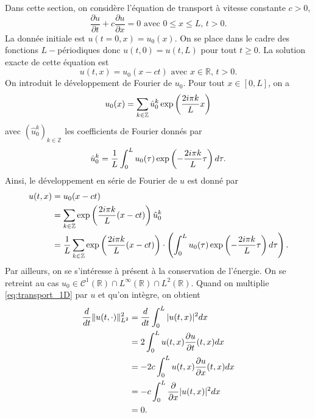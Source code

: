 Dans cette section, on considère l'équation de transport à vitesse constante $c>0$,
\begin{equation}
\dfrac{\partial u}{\partial t} + c \dfrac{\partial u}{\partial x} = 0 \text{ avec } 0 \leq x \leq L \text{, } t>0.
\label{eq:transport_1D}
\end{equation}
La donnée initiale est $u(t=0,x)=u_0(x)$. On se place dans le cadre des fonctions $L-$périodiques donc $u(t,0)=u(t,L)$ pour tout $t \geq 0$. La solution exacte de cette équation est
\begin{equation}
u(t,x) = u_0(x-ct)  \text{ avec } x \in \mathbb{R} \text{, } t>0.
\label{eq:trsp_exact}
\end{equation}
On introduit le développement de Fourier de $u_0$. Pour tout $x \in [0,L]$, on a
\begin{equation}
u_0(x) = \displaystyle\sum\limits_{k \in \mathbb{Z}} \hat{u}_0^k \exp \left( \dfrac{2i \pi k}{L} x \right)
\end{equation}
avec $(\hat{u}_0^k)_{k \in \mathbb{Z}}$ les coefficients de Fourier donnés par
\begin{equation}
\hat{u}_0^k = \dfrac{1}{L} \displaystyle\int_0^L u_0(\tau)  \exp \left( -\dfrac{2i \pi k}{L} \tau \right) d \tau.
\end{equation}
Ainsi, le développement en série de Fourier de $u$ est donné par
\begin{align}
u(t,x) & = u_0(x-ct)\\
	& = \displaystyle\sum\limits_{k \in \mathbb{Z}} \exp \left( \dfrac{2i \pi k}{L} (x-ct) \right) \hat{u}_0^k  \\
	& = \dfrac{1}{L} \displaystyle\sum\limits_{k \in \mathbb{Z}} \exp \left( \dfrac{2i \pi k}{L} (x-ct) \right) \cdot \left( \displaystyle\int_0^L u_0(\tau)  \exp \left( -\dfrac{2i \pi k}{L} \tau \right) d \tau \right).
	\label{eq:trsp_fourier}
\end{align}
Par ailleurs, on se s'intéresse à présent à la conservation de l'énergie. On se retreint au cas $u_0 \in \mathcal{C}^1(\mathbb{R}) \cap L^{\infty}(\mathbb{R}) \cap L^2(\mathbb{R})$. Quand on multiplie \eqref{eq:transport_1D} par $u$ et qu'on intègre, on obtient
\begin{align*}
\dfrac{d}{dt} \| u (t,\cdot) \|_{L^2}^2 & = \dfrac{d}{dt} \displaystyle\int_0^L |u(t,x)|^2 dx \\
	& = 2 \displaystyle\int_0^L u(t,x) \dfrac{\partial u}{\partial t}(t,x) dx \\
	& = - 2 c \displaystyle\int_0^L u(t,x) \dfrac{\partial u}{\partial x}(t,x) dx \\
	& = - c \displaystyle\int_0^L \dfrac{\partial}{\partial x} |u(t,x)|^2 dx \\
	& = 0.
\end{align*}

